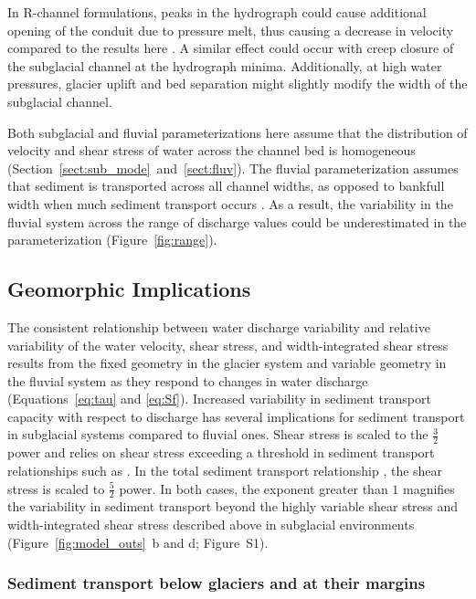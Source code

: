 \documentclass[11pt]{article}
\begin{document}
\begin{spacing}{1}
  In R-channel formulations, peaks in the hydrograph could cause additional opening of the conduit due to pressure melt, thus causing a decrease in velocity compared to the results here \citep{rothlisberger1972}.
  A similar effect could occur with creep closure of the subglacial channel at the hydrograph minima.
  Additionally, at high water pressures, glacier uplift and bed separation \citep{andrews2014} might slightly modify the width of the subglacial channel. 

  Both subglacial and fluvial parameterizations here assume that the distribution of velocity and shear stress of water across the channel bed is homogeneous (Section~\ref{sect:sub_mode}~and~\ref{sect:fluv}). 
  The fluvial parameterization assumes that sediment is transported across all channel widths, as opposed to bankfull width when much sediment transport occurs \citep{wolman1960}.
  As a result, the variability in the fluvial system across the range of discharge values could be underestimated in the parameterization (Figure~\ref{fig:range}).
  
  
  
  \subsection{Geomorphic Implications}
  \label{sect:GI}
  The consistent relationship between water discharge variability and relative variability of the water velocity, shear stress, and width-integrated shear stress results from the fixed geometry in the glacier system and variable geometry in the fluvial system as they respond to changes in water discharge (Equations~\ref{eq:tau} and \ref{eq:Sf}).
  Increased variability in sediment transport capacity with respect to discharge has several implications for sediment transport in subglacial systems compared to fluvial ones.
  Shear stress is scaled to the $\frac{3}{2}$ power  and relies on shear stress exceeding a threshold in sediment transport relationships  such as \citet{meyer1948}.
  In the total sediment transport relationship \citet{engelund1967}, the shear stress is scaled to $\frac{5}{2}$ power.
  In both cases, the exponent greater than $1$ magnifies the variability in sediment transport beyond the highly variable shear stress and width-integrated shear stress described above in subglacial environments (Figure~\ref{fig:model_outs}\, b and d; Figure~S1).

  \subsubsection{Sediment transport below glaciers and at their margins}
  

\end{spacing}
\end{document}
